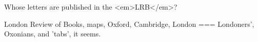 Whose letters are published in the <em>LRB</em>?

London Review of Books, maps, Oxford, Cambridge, London
===
Londoners’, Oxonians, and ’tabs’, it seems.
\nocite{loo2025} \nocite{loo2025b}